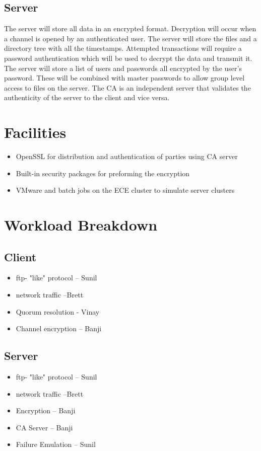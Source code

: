 \documentclass[11pt,a4paper,notitlepage,twocolumn]{report}
\begin{document}
\subsection{Server}
The server will store all data in an encrypted format. Decryption will occur when a channel is opened by an authenticated user. The server will store the files and a directory tree with all the timestamps. Attempted transactions will require a password authentication which will be used to decrypt the data and transmit it. The server will store a list of users and passwords all encrypted by the user’s password. These will be combined with master passwords to allow group level access to files on the server. The CA is an independent server that validates the authenticity of the server to the client and vice versa. 

\bigskip


\section{Facilities}
\begin{itemize}
\item   OpenSSL for distribution and authentication of parties using CA server
\item Built-in security packages for preforming the encryption
\item VMware and batch jobs on the ECE cluster to simulate server clusters
\end{itemize}

\section{Workload Breakdown}
\subsection{Client}
\begin{itemize}
\item ftp- "like" protocol – Sunil
\item network traffic –Brett
\item Quorum resolution - Vinay
\item Channel encryption – Banji
\end{itemize}
\subsection{Server}
\begin{itemize}
\item ftp- "like" protocol – Sunil
\item network traffic –Brett
\item Encryption – Banji
\item CA Server – Banji
\item Failure Emulation – Sunil
\end{itemize}
\end{document}
